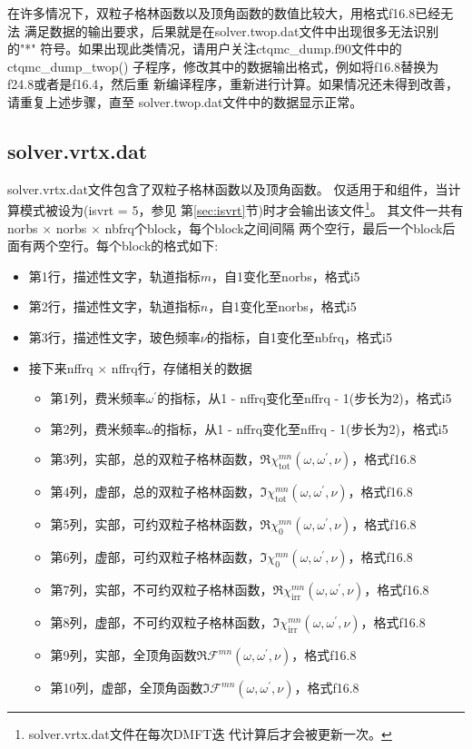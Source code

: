 在许多情况下，双粒子格林函数以及顶角函数的数值比较大，用格式f16.8已经无法
满足数据的输出要求，后果就是在solver.twop.dat文件中出现很多无法识别的"*"
符号。如果出现此类情况，请用户关注ctqmc\_dump.f90文件中的ctqmc\_dump\_twop()
子程序，修改其中的数据输出格式，例如将f16.8替换为f24.8或者是f16.4，然后重
新编译程序，重新进行计算。如果情况还未得到改善，请重复上述步骤，直至
solver.twop.dat文件中的数据显示正常。

\subsection{solver.vrtx.dat}
solver.vrtx.dat文件包含了双粒子格林函数以及顶角函数。
仅适用于{\gardenia}和{\narcissus}组件，当计算模式被设为(isvrt = 5，参见
第\ref{sec:isvrt}节)时才会输出该文件\footnote{solver.vrtx.dat文件在每次DMFT迭
代计算后才会被更新一次。}。
其文件一共有norbs $\times$ norbs $\times$ nbfrq个block，每个block之间间隔
两个空行，最后一个block后面有两个空行。每个block的格式如下:
\begin{itemize}
\item 第1行，描述性文字，轨道指标$m$，自1变化至norbs，格式i5
\item 第2行，描述性文字，轨道指标$n$，自1变化至norbs，格式i5
\item 第3行，描述性文字，玻色频率$\nu$的指标，自1变化至nbfrq，格式i5
\item 接下来nffrq $\times$ nffrq行，存储相关的数据
    \begin{itemize}
    \item 第1列，费米频率$\omega^{\prime}$的指标，从1 - nffrq变化至nffrq - 1(步长为2)，格式i5
    \item 第2列，费米频率$\omega$的指标，从1 - nffrq变化至nffrq - 1(步长为2)，格式i5
    \item 第3列，实部，总的双粒子格林函数，$\Re\chi^{mn}_{\text{tot}}(\omega,\omega^{\prime},\nu)$，格式f16.8
    \item 第4列，虚部，总的双粒子格林函数，$\Im\chi^{mn}_{\text{tot}}(\omega,\omega^{\prime},\nu)$，格式f16.8
    \item 第5列，实部，可约双粒子格林函数，$\Re\chi^{mn}_{0}(\omega,\omega^{\prime},\nu)$，格式f16.8
    \item 第6列，虚部，可约双粒子格林函数，$\Im\chi^{mn}_{0}(\omega,\omega^{\prime},\nu)$，格式f16.8
    \item 第7列，实部，不可约双粒子格林函数，$\Re\chi^{mn}_{\text{irr}}(\omega,\omega^{\prime},\nu)$，格式f16.8
    \item 第8列，虚部，不可约双粒子格林函数，$\Im\chi^{mn}_{\text{irr}}(\omega,\omega^{\prime},\nu)$，格式f16.8
    \item 第9列，实部，全顶角函数$\Re\mathcal{F}^{mn}(\omega,\omega^{\prime},\nu)$，格式f16.8
    \item 第10列，虚部，全顶角函数$\Im\mathcal{F}^{mn}(\omega,\omega^{\prime},\nu)$，格式f16.8
    \end{itemize}
\end{itemize}


